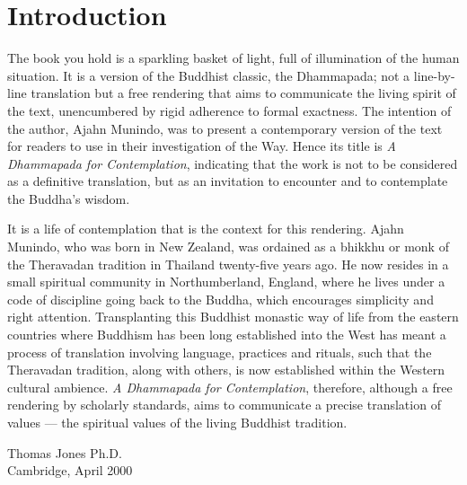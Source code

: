 
\chapter{Introduction}

The book you hold is a sparkling basket of light, full of illumination of the human situation. It is a version of the Buddhist classic, the Dhammapada; not a line-by-line translation but a free rendering that aims to communicate the living spirit of the text, unencumbered by rigid adherence to formal exactness. The intention of the author, Ajahn Munindo, was to present a contemporary version of the text for readers to use in their investigation of the Way. Hence its title is \emph{A Dhammapada for Contemplation}, indicating that the work is not to be considered as a definitive translation, but as an invitation to encounter and to contemplate the Buddha’s wisdom.

It is a life of contemplation that is the context for this rendering. Ajahn Munindo, who was born in New Zealand, was ordained as a bhikkhu or monk of the Theravadan tradition in Thailand twenty-five years ago. He now resides in a small spiritual community in Northumberland, England, where he lives under a code of discipline going back to the Buddha, which encourages simplicity and right attention. Transplanting this Buddhist monastic way of life from the eastern countries where Buddhism has been long established into the West has meant a process of translation involving language, practices and rituals, such that the Theravadan tradition, along with others, is now established within the Western cultural ambience. \emph{A Dhammapada for Contemplation}, therefore, although a free rendering by scholarly standards, aims to communicate a precise translation of values — the spiritual values of the living Buddhist tradition.

\bigskip

{\raggedleft
Thomas Jones Ph.D.\\
Cambridge, April 2000
\par}
